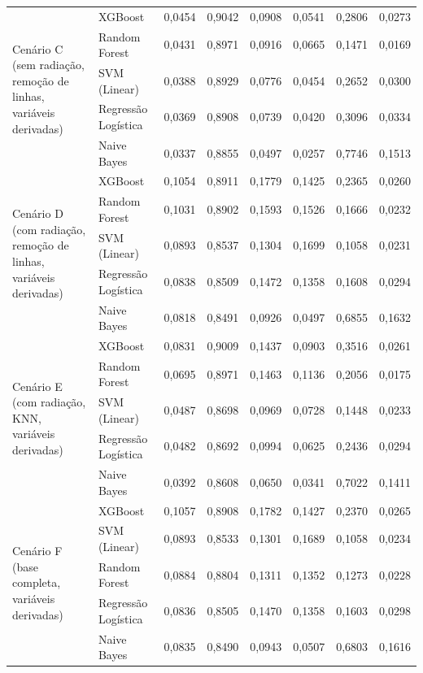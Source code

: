 \begin{longtable}{p{3.4cm} l c c c c c c}
\multirow{5}{*}{\parbox{3.4cm}{\centering Cenário C\\(sem radiação, remoção de linhas, variáveis derivadas)}} 
   & XGBoost             & 0,0454 & 0,9042 & 0,0908 & 0,0541 & 0,2806 & 0,0273 \\
   & Random Forest       & 0,0431 & 0,8971 & 0,0916 & 0,0665 & 0,1471 & 0,0169 \\
   & SVM (Linear)        & 0,0388 & 0,8929 & 0,0776 & 0,0454 & 0,2652 & 0,0300 \\
   & Regressão Logística & 0,0369 & 0,8908 & 0,0739 & 0,0420 & 0,3096 & 0,0334 \\
   & Naive Bayes         & 0,0337 & 0,8855 & 0,0497 & 0,0257 & 0,7746 & 0,1513 \\
\midrule

\multirow{5}{*}{\parbox{3.4cm}{\centering Cenário D\\(com radiação, remoção de linhas, variáveis derivadas)}} 
   & XGBoost             & 0,1054 & 0,8911 & 0,1779 & 0,1425 & 0,2365 & 0,0260 \\
   & Random Forest       & 0,1031 & 0,8902 & 0,1593 & 0,1526 & 0,1666 & 0,0232 \\
   & SVM (Linear)        & 0,0893 & 0,8537 & 0,1304 & 0,1699 & 0,1058 & 0,0231 \\
   & Regressão Logística & 0,0838 & 0,8509 & 0,1472 & 0,1358 & 0,1608 & 0,0294 \\
   & Naive Bayes         & 0,0818 & 0,8491 & 0,0926 & 0,0497 & 0,6855 & 0,1632 \\
\midrule

\multirow{5}{*}{\parbox{3.4cm}{\centering Cenário E\\(com radiação, KNN, variáveis derivadas)}} 
   & XGBoost             & 0,0831 & 0,9009 & 0,1437 & 0,0903 & 0,3516 & 0,0261 \\
   & Random Forest       & 0,0695 & 0,8971 & 0,1463 & 0,1136 & 0,2056 & 0,0175 \\
   & SVM (Linear)        & 0,0487 & 0,8698 & 0,0969 & 0,0728 & 0,1448 & 0,0233 \\
   & Regressão Logística & 0,0482 & 0,8692 & 0,0994 & 0,0625 & 0,2436 & 0,0294 \\
   & Naive Bayes         & 0,0392 & 0,8608 & 0,0650 & 0,0341 & 0,7022 & 0,1411 \\
\midrule

\multirow{5}{*}{\parbox{3.4cm}{\centering Cenário F\\(base completa, variáveis derivadas)}} 
   & XGBoost             & 0,1057 & 0,8908 & 0,1782 & 0,1427 & 0,2370 & 0,0265 \\
   & SVM (Linear)        & 0,0893 & 0,8533 & 0,1301 & 0,1689 & 0,1058 & 0,0234 \\
   & Random Forest       & 0,0884 & 0,8804 & 0,1311 & 0,1352 & 0,1273 & 0,0228 \\
   & Regressão Logística & 0,0836 & 0,8505 & 0,1470 & 0,1358 & 0,1603 & 0,0298 \\
   & Naive Bayes         & 0,0835 & 0,8490 & 0,0943 & 0,0507 & 0,6803 & 0,1616 \\
\end{longtable}
\endgroup

